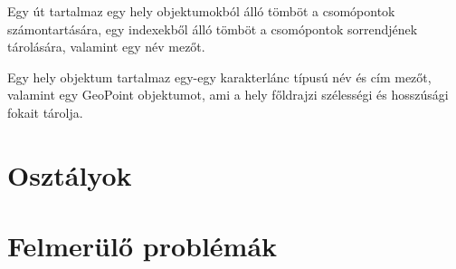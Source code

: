 Egy út tartalmaz egy hely objektumokból álló tömböt a csomópontok számontartására, egy indexekből álló tömböt a csomópontok sorrendjének tárolására, valamint egy név mezőt.

Egy hely objektum tartalmaz egy-egy karakterlánc típusú név és cím mezőt, valamint egy GeoPoint objektumot, ami a hely főldrajzi szélességi és hosszúsági fokait tárolja.
 

\section{Osztályok}\label{sec:ALAP:adatelem}

\section{Felmerülő problémák}\label{sec:ALAP:adatelem}

